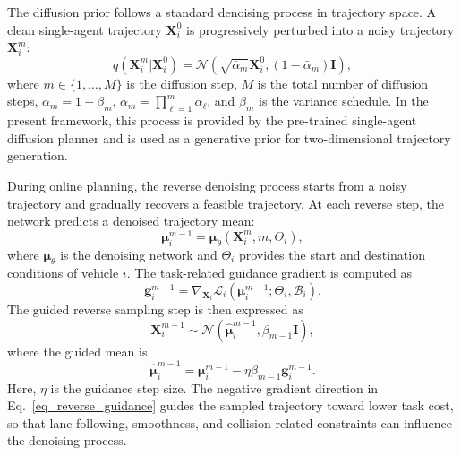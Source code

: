\documentclass[journal]{IEEEtran}
\begin{document}
The diffusion prior follows a standard denoising process in trajectory space. A clean single-agent trajectory $\mathbf{X}_i^{0}$ is progressively perturbed into a noisy trajectory $\mathbf{X}_i^{m}$:
\begin{equation}
q(\mathbf{X}_i^{m}|\mathbf{X}_i^{0})
=
\mathcal{N}
\left(
\sqrt{\bar{\alpha}_{m}}\mathbf{X}_i^{0},
(1-\bar{\alpha}_{m})\mathbf{I}
\right),
\label{eq_forward_process}
\end{equation}
where $m\in\{1,\ldots,M\}$ is the diffusion step, $M$ is the total number of diffusion steps, $\alpha_m=1-\beta_m$, $\bar{\alpha}_{m}=\prod_{\ell=1}^{m}\alpha_{\ell}$, and $\beta_m$ is the variance schedule. In the present framework, this process is provided by the pre-trained single-agent diffusion planner and is used as a generative prior for two-dimensional trajectory generation.

During online planning, the reverse denoising process starts from a noisy trajectory and gradually recovers a feasible trajectory. At each reverse step, the network predicts a denoised trajectory mean:
\begin{equation}
\boldsymbol{\mu}_{i}^{m-1}
=
\boldsymbol{\mu}_{\theta}
(\mathbf{X}_i^{m},m,\Theta_i),
\label{eq_denoised_mean}
\end{equation}
where $\boldsymbol{\mu}_{\theta}$ is the denoising network and $\Theta_i$ provides the start and destination conditions of vehicle $i$. The task-related guidance gradient is computed as
\begin{equation}
\mathbf{g}_{i}^{m-1}
=
\nabla_{\mathbf{X}_i}
\mathcal{L}_i
(
\boldsymbol{\mu}_{i}^{m-1};
\Theta_i,\mathcal{B}_i
).
\label{eq_guidance_gradient}
\end{equation}
The guided reverse sampling step is then expressed as
\begin{equation}
\mathbf{X}_i^{m-1}
\sim
\mathcal{N}
\left(
\widehat{\boldsymbol{\mu}}_{i}^{m-1},
\beta_{m-1}\mathbf{I}
\right),
\label{eq_reverse_sampling}
\end{equation}
where the guided mean is
\begin{equation}
\widehat{\boldsymbol{\mu}}_{i}^{m-1}
=
\boldsymbol{\mu}_{i}^{m-1}
-
\eta\beta_{m-1}\mathbf{g}_{i}^{m-1}.
\label{eq_reverse_guidance}
\end{equation}
Here, $\eta$ is the guidance step size. The negative gradient direction in Eq.~\eqref{eq_reverse_guidance} guides the sampled trajectory toward lower task cost, so that lane-following, smoothness, and collision-related constraints can influence the denoising process.
\end{document}
